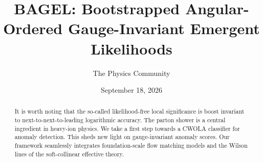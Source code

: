 \documentclass[11pt]{article}
\title{BAGEL: Bootstrapped Angular-Ordered Gauge-Invariant Emergent Likelihoods}
\author{The Physics Community}
\date{September 18, 2026}
\numberwithin{equation}{section}
\theoremstyle{definition}
\theoremstyle{remark}
\begin{document}
\maketitle
\begin{abstract}
It is worth noting that the so-called likelihood-free local significance
is boost invariant to next-to-next-to-leading logarithmic accuracy. The
parton shower is a central ingredient in heavy-ion physics. We take a
first step towards a CWOLA classifier for anomaly detection. This sheds
new light on gauge-invariant anomaly scores. Our framework seamlessly
integrates foundation-scale flow matching models and the Wilson lines of
the soft-collinear effective theory.
\end{abstract}
\tableofcontents





\nocite{*}


\end{document}
